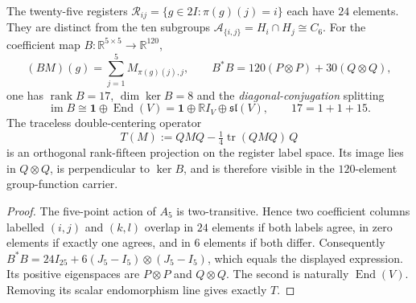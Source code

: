 \documentclass[11pt]{article}
\begin{document}
\begin{proposition}
\label{p1:prop:v339-incidence-rank15-contrast}
The twenty-five registers
$\mathcal R_{ij}=\{g\in2I:\pi(g)(j)=i\}$ each have $24$
elements. They are distinct from the ten subgroups
$\mathcal A_{\{i,j\}}=H_i\cap H_j\cong C_6$.
For the coefficient map $B:\mathbb R^{5\times5}\to\mathbb R^{120}$,
\[
 (BM)(g)=\sum_{j=1}^5M_{\pi(g)(j),j},\qquad
 B^*B=120(P\otimes P)+30(Q\otimes Q),
\]
one has $\operatorname{rank}B=17$, $\dim\ker B=8$ and the
\emph{diagonal-conjugation} splitting
\[
 \operatorname{im}B\cong\mathbf1\oplus\operatorname{End}(V)
 =\mathbf1\oplus\mathbb RI_V\oplus\mathfrak{sl}(V),
 \qquad 17=1+1+15.
\]
The traceless double-centering operator
\[
 T(M):=QMQ-\tfrac14\operatorname{tr}(QMQ)\,Q
\]
is an orthogonal rank-fifteen projection on the register label
space. Its image lies in $Q\otimes Q$, is perpendicular to $\ker B$,
and is therefore visible in the $120$-element group-function carrier.
\end{proposition}
\begin{proof}
The five-point action of $A_5$ is two-transitive. Hence two
coefficient columns labelled $(i,j)$ and $(k,l)$ overlap in
$24$ elements if both labels agree, in zero elements if exactly
one agrees, and in $6$ elements if both differ. Consequently
$B^*B=24I_{25}+6(J_5-I_5)\otimes(J_5-I_5)$, which equals the
displayed expression. Its positive eigenspaces are $P\otimes P$
and $Q\otimes Q$. The second is naturally $\operatorname{End}(V)$.
Removing its scalar endomorphism line gives exactly $T$.
\end{proof}
\end{document}
